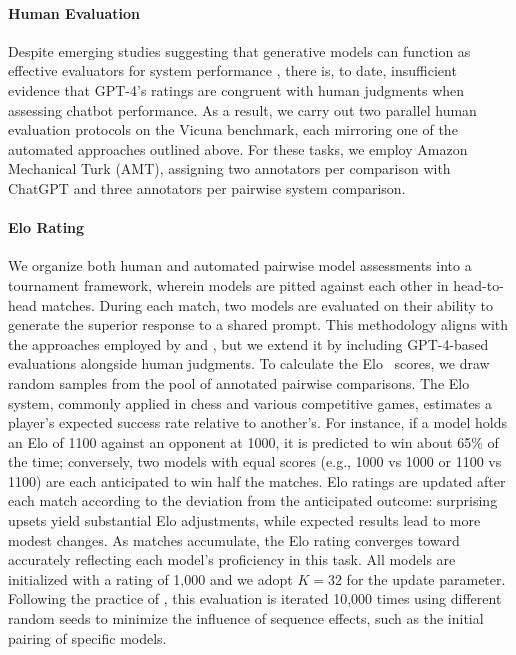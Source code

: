 \paragraph{Human Evaluation} Despite emerging studies suggesting that generative models can function as effective evaluators for system performance \citep{fu2023gptscore}, there is, to date, insufficient evidence that GPT-4’s ratings are congruent with human judgments when assessing chatbot performance. As a result, we carry out two parallel human evaluation protocols on the Vicuna benchmark, each mirroring one of the automated approaches outlined above. For these tasks, we employ Amazon Mechanical Turk (AMT), assigning two annotators per comparison with ChatGPT and three annotators per pairwise system comparison.

\paragraph{Elo Rating} We organize both human and automated pairwise model assessments into a tournament framework, wherein models are pitted against each other in head-to-head matches. During each match, two models are evaluated on their ability to generate the superior response to a shared prompt. This methodology aligns with the approaches employed by \citet{bai2022training} and \citet{vicuna2023}, but we extend it by including GPT-4-based evaluations alongside human judgments. To calculate the Elo~\citep{elo1967proposed,elo1978rating} scores, we draw random samples from the pool of annotated pairwise comparisons. The Elo system, commonly applied in chess and various competitive games, estimates a player's expected success rate relative to another's. For instance, if a model holds an Elo of 1100 against an opponent at 1000, it is predicted to win about 65\% of the time; conversely, two models with equal scores (e.g., 1000 vs 1000 or 1100 vs 1100) are each anticipated to win half the matches. Elo ratings are updated after each match according to the deviation from the anticipated outcome: surprising upsets yield substantial Elo adjustments, while expected results lead to more modest changes. As matches accumulate, the Elo rating converges toward accurately reflecting each model’s proficiency in this task. All models are initialized with a rating of 1,000 and we adopt $K=32$ for the update parameter. Following the practice of \citet{vicuna2023}, this evaluation is iterated 10,000 times using different random seeds to minimize the influence of sequence effects, such as the initial pairing of specific models.

